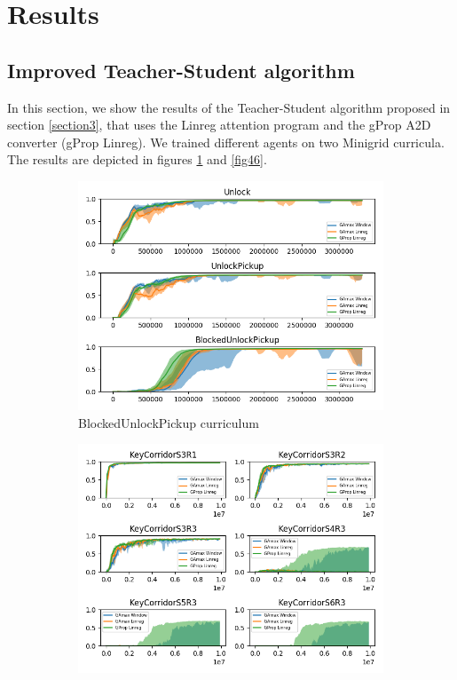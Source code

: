 \documentclass{article}
\begin{document}
\section{Results}

\subsection{Improved Teacher-Student algorithm}
\label{23}
In this section, we show the results of the Teacher-Student algorithm proposed in section \ref{section3}, that uses the Linreg attention program and the gProp A2D converter (gProp Linreg). We trained different agents on two Minigrid curricula. The results are depicted in figures \ref{fig45} and \ref{fig46}.

\begin{figure}
     \centering
     \begin{subfigure}[b]{0.45\textwidth}
         \centering
         \includegraphics[width=\textwidth]{Stats/BUP-Return-GAmaxWindow-GAmaxLinreg-GPropLinreg}
         \caption{BlockedUnlockPickup curriculum}
         \label{fig45}
     \end{subfigure}
     \hfill
     \begin{subfigure}[b]{0.45\textwidth}
         \centering
         \includegraphics[width=\textwidth]{Stats/KC-Return-GAmaxWindow-GAmaxLinreg-GPropLinreg}

\end{subfigure}
\end{figure}
\end{document}
